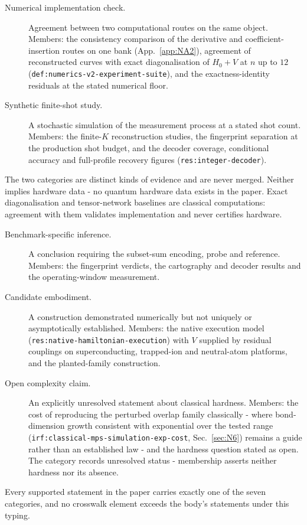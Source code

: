 \begin{description}
\item[Numerical implementation check.] Agreement between two computational routes on the same object. Members: the consistency comparison of the derivative and coefficient-insertion routes on one bank (App.~\ref{app:NA2}), agreement of reconstructed curves with exact diagonalisation of $H_0+V$ at $n$ up to $12$ (\texttt{def:numerics-v2-experiment-suite}), and the exactness-identity residuals at the stated numerical floor.
\item[Synthetic finite-shot study.] A stochastic simulation of the measurement process at a stated shot count. Members: the finite-$K$ reconstruction studies, the fingerprint separation at the production shot budget, and the decoder coverage, conditional accuracy and full-profile recovery figures (\texttt{res:integer-decoder}).
\end{description}
The two categories are distinct kinds of evidence and are never merged. Neither implies hardware data - no quantum hardware data exists in the paper. Exact diagonalisation and tensor-network baselines are classical computations: agreement with them validates implementation and never certifies hardware.

\begin{description}
\item[Benchmark-specific inference.] A conclusion requiring the subset-sum encoding, probe and reference. Members: the fingerprint verdicts, the cartography and decoder results and the operating-window measurement.
\item[Candidate embodiment.] A construction demonstrated numerically but not uniquely or asymptotically established. Members: the native execution model (\texttt{res:native-hamiltonian-execution}) with $V$ supplied by residual couplings on superconducting, trapped-ion and neutral-atom platforms, and the planted-family construction.
\item[Open complexity claim.] An explicitly unresolved statement about classical hardness. Members: the cost of reproducing the perturbed overlap family classically - where bond-dimension growth consistent with exponential over the tested range (\texttt{irf:classical-mps-simulation-exp-cost}, Sec.~\ref{sec:N6}) remains a guide rather than an established law - and the hardness question stated as open. The category records unresolved status - membership asserts neither hardness nor its absence.
\end{description}
Every supported statement in the paper carries exactly one of the seven categories, and no crosswalk element exceeds the body's statements under this typing.

